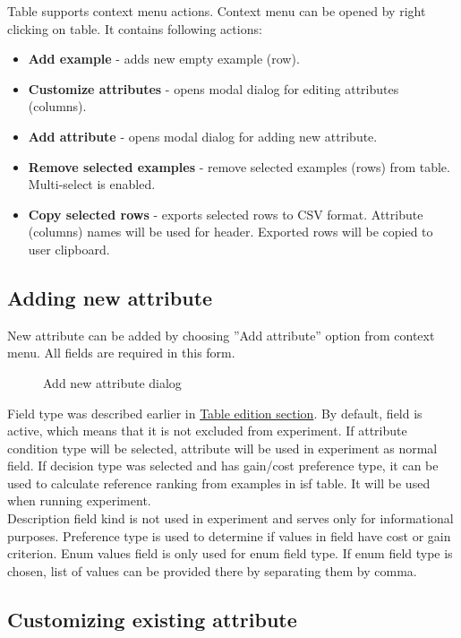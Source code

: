 Table supports context menu actions. Context menu can be opened by right clicking on table. It contains following actions:
\begin{itemize}
	\item \textbf{Add example} - adds new empty example (row).
	\item \textbf{Customize attributes} - opens modal dialog for editing attributes (columns).
	\item \textbf{Add attribute} - opens modal dialog for adding new attribute.
	\item \textbf{Remove selected examples} - remove selected examples (rows) from table. Multi-select is enabled.
	\item \textbf{Copy selected rows} - exports selected rows to CSV format. Attribute (columns) names will be used for header. Exported rows will be copied to user clipboard.
\end{itemize}

\subsection{Adding new attribute}\label{sub:isf-add-attr}

New attribute can be added by choosing ''Add attribute'' option from context menu. All fields are required in this form.

\begin{figure*}[!ht] 
	\centering
	\caption{Add new attribute dialog}
\end{figure*}

Field type was described earlier in \hyperref[sub:isf-examples]{Table edition section}. By default, field is active, which means that it is not excluded from experiment.
If attribute condition type will be selected, attribute will be used in experiment as normal field. If decision type was selected and has gain/cost preference type, it can be used to calculate reference ranking from examples in isf table. It will be used when running experiment. 
\\ Description field kind is not used in experiment and serves only for informational purposes. Preference type is used to determine if values in field have cost or gain criterion. Enum values field is only used for enum field type. If enum field type is chosen, list of values can be provided there by separating them by comma.

\subsection{Customizing existing attribute}\label{sub:isf-cust-attr}

